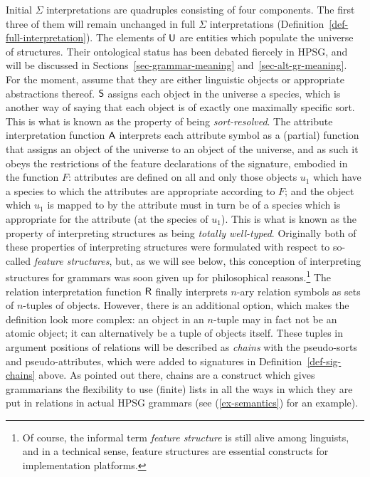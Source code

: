 \documentclass[output=paper
 	        ,biblatex
                ,babelshorthands
                ,newtxmath
                ,draftmode
                ,colorlinks, citecolor=brown
]{langscibook}
\begin{document}
{Initial $\Sigma$ interpretations are quadruples consisting of four
components. The first three of them will remain unchanged in full
$\Sigma$ interpretations (Definition~\ref{def-full-interpretation}). The elements of $\mathsf{U}$
are entities which populate the universe of structures. Their ontological
status has been debated fiercely in HPSG, and will be discussed in
Sections~\ref{sec-grammar-meaning} and~\ref{sec-alt-gr-meaning}. For the
moment, assume that they are either linguistic objects or appropriate
abstractions thereof. $\mathsf{S}$ assigns each object in the universe
a species, which is another way of saying that each object is of exactly
one maximally specific sort. This is what is known as the property of being
\emph{sort-resolved}. The attribute interpretation function $\mathsf{A}$
interprets each attribute symbol as a (partial) function that assigns an
object of the universe to an object of the universe, and as such it
obeys the restrictions of the feature declarations of the signature,
embodied in the function $F$: attributes are defined on all and only
those objects $u_1$ which have a species to which the attributes are appropriate
according to $F$; and the object which $u_1$ is mapped to by the attribute
must in turn be of a species which is appropriate for the attribute
(at the species of $u_1$). %
This is what is known as the property of
interpreting structures as being \emph{totally well-typed}. Originally both
of these properties of interpreting structures were formulated with
respect to so-called \emph{feature structures}, but, as we will see below,
this conception of interpreting structures for grammars
was soon given up for philosophical reasons.\footnote{Of course, the
  informal term \emph{feature structure} is still alive among
  linguists, and in a technical sense, feature structures are essential constructs
  for implementation platforms.} The relation interpretation function
$\mathsf{R}$ finally interprets $n$-ary
relation symbols as sets of $n$-tuples of objects. However, there is
an additional option, which makes the definition look more complex: an
object in an $n$-tuple may in fact not be an atomic object; it can
alternatively be a tuple of objects itself. These tuples in
argument positions of relations will be described as \emph{chains}
with the pseudo-sorts and pseudo-attributes, which were
added to signatures in
Definition~\ref{def-sig-chains} above.  As pointed out there, chains
are a construct which gives grammarians the flexibility to
use (finite) lists in all the ways in which they are put in relations
in actual HPSG grammars (see (\ref{ex-semantics}) for an example). %

}
\end{document}
